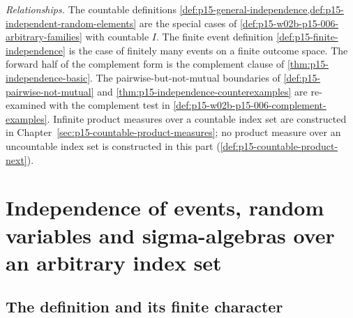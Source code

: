 \emph{Relationships.} The countable definitions
\cref{def:p15-general-independence,def:p15-independent-random-elements}
are the special cases of
\cref{def:p15-w02b-p15-006-arbitrary-families} with countable \(I\).
The finite event definition \cref{def:p15-finite-independence} is the
case of finitely many events on a finite outcome space. The forward
half of the complement form is the complement clause of
\cref{thm:p15-independence-basic}. The pairwise-but-not-mutual
boundaries of \cref{def:p15-pairwise-not-mutual} and
\cref{thm:p15-independence-counterexamples} are re-examined with the
complement test in \cref{def:p15-w02b-p15-006-complement-examples}.
Infinite product measures over a countable index set are constructed in
Chapter~\ref{sec:p15-countable-product-measures}; no product measure over
an uncountable index set is constructed in this part
(\cref{def:p15-countable-product-next}).

\section{Independence of events, random variables and sigma-algebras over an arbitrary index set}
\label{sec:p15-w02b-p15-006-families}

\subsection{The definition and its finite character}
\label{sec:p15-w02b-p15-006-definition}

